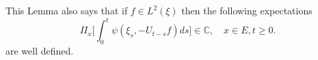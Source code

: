 \documentclass[12pt]{amsart}
\theoremstyle{plain}
\theoremstyle{definition}
\numberwithin{equation}{section}
\begin{document}
    This Lemma also says that if $f\in L^2(\xi)$ then the following expectations
\[
    \Pi_x\Big[\int_0^t \psi(\xi_s,- U_{t-s}f)ds\Big]
    \in \mathbb C,
    \quad x\in E, t\geq 0.
\]
    are well defined. 
\end{document}
